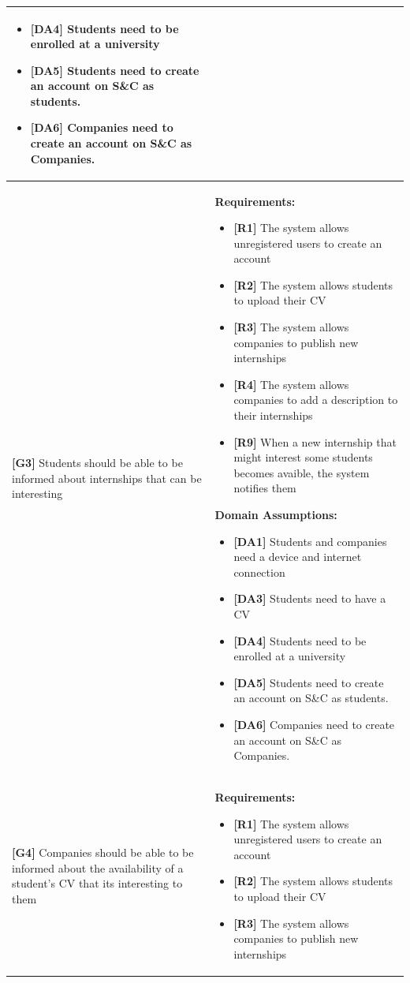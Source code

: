 \begin{longtable}{|p{}|p{}|}
\begin{itemize}
     \item \textbf{[DA4]} Students need to be enrolled at a university
    \item \textbf{[DA5]} Students need to create an account on S\&C as students.
    \item \textbf{[DA6]} Companies need to create an account on S\&C as Companies.
\end{itemize} \\
\hline
\textbf{[G3]} Students should be able to be informed about internships that can be interesting 
& 
\textbf{Requirements:}
\begin{itemize}
    \item \textbf{[R1]} The system allows unregistered users to create an account
    \item \textbf{[R2]} The system allows students to upload their CV
    \item \textbf{[R3]} The system allows companies to publish new internships
    \item \textbf{[R4]} The system allows companies to add a description to their internships
    \item \textbf{[R9]} When a new internship that might interest some students becomes avaible, the system notifies them
\end{itemize}
\textbf{Domain Assumptions:}
\begin{itemize}
      \item \textbf{[DA1]} Students and companies need a device and internet connection
    \item \textbf{[DA3]} Students need to have a CV
     \item \textbf{[DA4]} Students need to be enrolled at a university
    \item \textbf{[DA5]} Students need to create an account on S\&C as students.
    \item \textbf{[DA6]} Companies need to create an account on S\&C as Companies.
\end{itemize} \\
\hline
\textbf{[G4]} Companies should be able to be informed about the availability of a student's CV that its interesting to them
& 
\textbf{Requirements:}
\begin{itemize}
    \item \textbf{[R1]} The system allows unregistered users to create an account
    \item \textbf{[R2]} The system allows students to upload their CV
    \item \textbf{[R3]} The system allows companies to publish new internships

\end{itemize}
\end{longtable}
